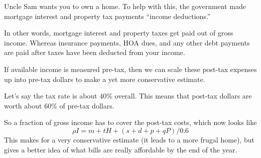 \documentclass{article}
\begin{document}
Uncle Sam wants you to own a home. To help with this, the government 
made mortgage interest and property tax payments 
``income deductions.''

 In other words, mortgage interest and property taxes get paid out 
of gross income. Whereas
insurance payments, HOA dues, and any other debt payments 
are paid after taxes have been deducted from your income. 

If available income is 
measured pre-tax, then we can scale these post-tax expenses up 
into pre-tax dollars to make a yet more conservative estimate.

Let's say the tax rate is about $40$\% overall. This means that 
post-tax dollars are worth about $60$\% of pre-tax dollars.

So a fraction of gross income has to cover the post-tax costs, 
which now looks like
\begin{equation}
\label{AvailableIncomePostTax}
\rho I = m + tH + (s + d + p + qP) / 0.6
\end{equation}
This makes for a very conservative estimate (it 
leads to a more frugal home), but gives a better idea of what 
bills are really affordable by the end of the year.

\pagebreak
\end{document}
